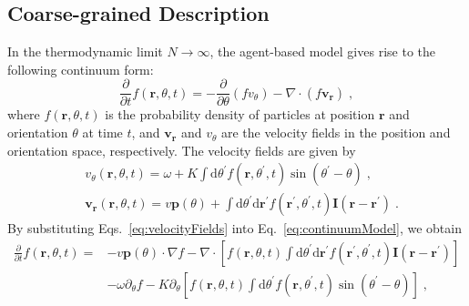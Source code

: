 \documentclass[10pt,aspectratio=43,mathserif,table]{beamer}
\begin{document}
\subsection{Coarse-grained Description}
\begin{frame}
    \small
    In the thermodynamic limit $N\rightarrow \infty$, the agent-based model gives rise to the following continuum form:
    \begin{equation}
        \frac{\partial}{\partial t}f\left( \mathbf{r},\theta ,t \right) =-\frac{\partial}{\partial \theta}\left( fv_{\theta} \right) -\nabla \cdot \left( f\mathbf{v}_{\mathbf{r}} \right) \;, \label{eq:continuumModel}
    \end{equation}
    where $f\left( \mathbf{r},\theta ,t \right)$ is the probability density of particles at position $\mathbf{r}$ and orientation $\theta$ at time $t$, and $\mathbf{v}_{\mathbf{r}}$ and $v_{\theta}$ are the velocity fields in the position and orientation space, respectively. The velocity fields are given by
    \begin{subequations}
        \begin{align}
            &v_{\theta}\left( \mathbf{r},\theta ,t \right) =\omega +K\int{\mathrm{d}\theta ^{\prime}f\left( \mathbf{r},\theta ^{\prime},t \right) \sin \left( \theta ^{\prime}-\theta \right)}\;,\\
            &\mathbf{v}_{\mathbf{r}}\left( \mathbf{r},\theta ,t \right) =v\mathbf{p}\left( \theta \right) +\int{\mathrm{d}\theta ^{\prime}\mathrm{d}\mathbf{r}^{\prime}f\left( \mathbf{r}^{\prime},\theta ^{\prime},t \right) \mathbf{I}\left( \mathbf{r}-\mathbf{r}^{\prime} \right) \;.}
        \end{align}
        \label{eq:velocityFields}
    \end{subequations}
    By substituting Eqs.~\eqref{eq:velocityFields} into Eq.~\eqref{eq:continuumModel}, we obtain
    \begin{equation}
        \begin{aligned}
            \frac{\partial}{\partial t}f\left( \mathbf{r},\theta ,t \right) =&-v\mathbf{p}\left( \theta \right) \cdot \nabla f-\nabla \cdot \left[ f\left( \mathbf{r},\theta ,t \right) \int{\mathrm{d}\theta ^{\prime}\mathrm{d}\mathbf{r}^{\prime}f\left( \mathbf{r}^{\prime},\theta ^{\prime},t \right) \mathbf{I}\left( \mathbf{r}-\mathbf{r}^{\prime} \right)} \right]\\
            &-\omega \partial _{\theta}f-K\partial _{\theta}\left[f\left( \mathbf{r},\theta ,t \right) \int{\mathrm{d}\theta ^{\prime}f\left( \mathbf{r},\theta ^{\prime},t \right) \sin \left( \theta ^{\prime}-\theta \right)}\right]\;,\\
        \end{aligned}
    \end{equation}
\end{frame}
\end{document}
